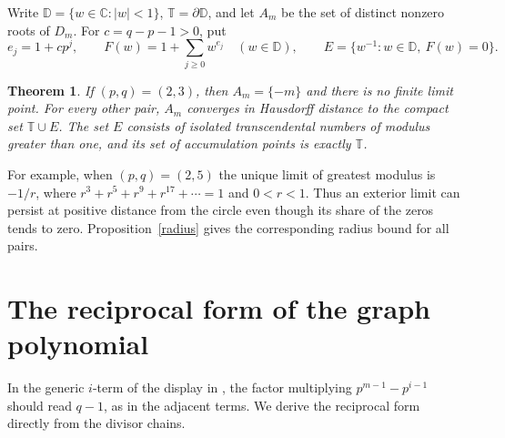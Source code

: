 \documentclass[11pt]{article}
\newtheorem{theorem}{Theorem}[section]
\newcommand{\D}{\mathbb D}
\newcommand{\T}{\mathbb T}
\newcommand{\C}{\mathbb C}
\begin{document}
Write \(\D=\{w\in\C:|w|<1\}\), \(\T=\partial\D\), and let \(A_m\)
be the set of distinct nonzero roots of \(D_m\). For \(c=q-p-1>0\), put
\begin{equation}\label{series}
 e_j=1+cp^j,\qquad
 F(w)=1+\sum_{j\ge0}w^{e_j}\quad(w\in\D),\qquad
 E=\{w^{-1}:w\in\D,\ F(w)=0\}.
\end{equation}

\begin{theorem}\label{limit}
If \((p,q)=(2,3)\), then \(A_m=\{-m\}\) and there is no finite
limit point. For every other pair, \(A_m\) converges in Hausdorff
distance to the compact set \(\T\cup E\). The set \(E\) consists of
isolated transcendental numbers of modulus greater than one, and its
set of accumulation points is exactly \(\T\).
\end{theorem}

\noindent For example, when \((p,q)=(2,5)\) the unique limit of greatest
modulus is \(-1/r\), where \(r^3+r^5+r^9+r^{17}+\cdots=1\) and
\(0<r<1\). Thus an exterior limit can persist at positive distance
from the circle even though its share of the zeros tends to zero.
Proposition~\ref{radius} gives the corresponding radius bound for all
pairs.

\section{The reciprocal form of the graph polynomial}

In the generic \(i\)-term of the display in \cite[Theorem~2.4]{rather24},
the factor multiplying \(p^{m-1}-p^{i-1}\) should read \(q-1\),
as in the adjacent terms. We derive the reciprocal form directly
from the divisor chains.
\end{document}
